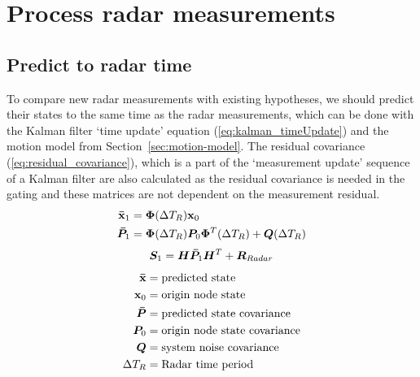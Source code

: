 \section{Process radar measurements}
\subsection{Predict to radar time}
To compare new radar measurements with existing hypotheses, we should predict their states to the same time as the radar measurements, which can be done with the Kalman filter `time update' equation (\ref{eq:kalman_timeUpdate}) and the motion model from Section~\ref{sec:motion-model}. The residual covariance (\ref{eq:residual_covariance}), which is a part of the `measurement update' sequence of a Kalman filter are also calculated as the residual covariance is needed in the gating and these matrices are not dependent on the measurement residual.
\begin{equation}\label{eq:kalman_timeUpdate}
\begin{split}
\boldsymbol{\mathbf{\bar{x}}}_1 	&= \bm{\Phi}(\Delta T_R) \boldsymbol{\mathbf{x}}_0 \\
\bm{\bar{P}}_1	&= \bm{\Phi}(\Delta T_R) \bm{P}_0 \bm{\Phi}^T(\Delta T_R) + \bm{Q}(\Delta T_R) \\
\end{split}
\end{equation}
\begin{equation}\label{eq:residual_covariance}
\bm{S}_1	= \bm{H}\bm{\bar{P}}_1 \bm{H}^T + \bm{R}_{Radar}
\end{equation}
\begin{equation*}
\begin{split}
\boldsymbol{\mathbf{\bar{x}}}		&= \text{predicted state} \\
\boldsymbol{\mathbf{x}}_0 		&= \text{origin node state} \\
\bm{\bar{P}} 	&= \text{predicted state covariance} \\
\bm{P}_0 		&= \text{origin node state covariance} \\
\bm{Q}			&= \text{system noise covariance} \\
\Delta T_R 		&= \text{Radar time period} \\
\end{split}
\end{equation*}


